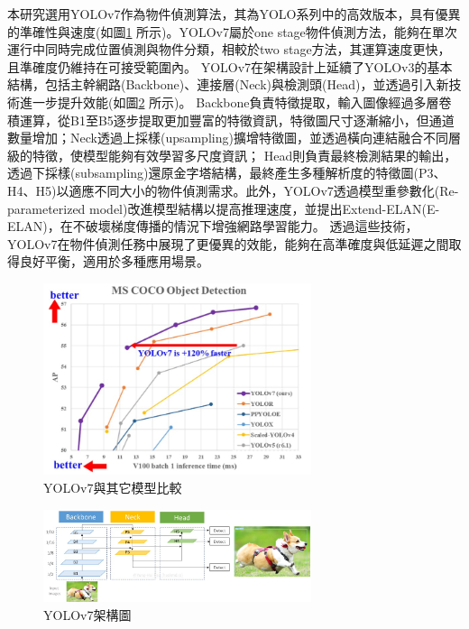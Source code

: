 \documentclass[12pt]{article}       %
\renewcommand{\figurename}{圖}                           %
\begin{document}
本研究選用YOLOv7\cite{wang2023yolov7}作為物件偵測算法，其為YOLO系列中的高效版本，具有優異的準確性與速度(如圖\ref{fig:yolov7_2} 所示)。YOLOv7屬於one stage物件偵測方法，能夠在單次運行中同時完成位置偵測與物件分類，相較於two stage方法，其運算速度更快，且準確度仍維持在可接受範圍內。
YOLOv7在架構設計上延續了YOLOv3的基本結構，包括主幹網路(Backbone)、連接層(Neck)與檢測頭(Head)，並透過引入新技術進一步提升效能(如圖\ref{fig:yolov7_3} 所示)。
Backbone負責特徵提取，輸入圖像經過多層卷積運算，從B1至B5逐步提取更加豐富的特徵資訊，特徵圖尺寸逐漸縮小，但通道數量增加；Neck透過上採樣(upsampling)擴增特徵圖，並透過橫向連結融合不同層級的特徵，使模型能夠有效學習多尺度資訊；
Head則負責最終檢測結果的輸出，透過下採樣(subsampling)還原金字塔結構，最終產生多種解析度的特徵圖(P3、H4、H5)以適應不同大小的物件偵測需求。此外，YOLOv7透過模型重參數化(Re-parameterized model)改進模型結構以提高推理速度，並提出Extend-ELAN(E-ELAN)，在不破壞梯度傳播的情況下增強網路學習能力。
透過這些技術，YOLOv7在物件偵測任務中展現了更優異的效能，能夠在高準確度與低延遲之間取得良好平衡，適用於多種應用場景。

\begin{figure}[htbp]
    \centering
    \renewcommand{\figurename}{圖}                              %
    \includegraphics[width=0.7\textwidth]{yolov7_2.jpg}         %
    \caption{YOLOv7與其它模型比較\cite{wang2023yolov7}}           %
    \label{fig:yolov7_2}                                        %
\end{figure}

\begin{figure}[htbp]
    \centering
    \renewcommand{\figurename}{圖} %
    \includegraphics[width=0.7\textwidth]{yolov7_3.jpg}     %
    \caption{YOLOv7架構圖\cite{hackmd}}    %
    \label{fig:yolov7_3}    %
\end{figure}
\end{document}

